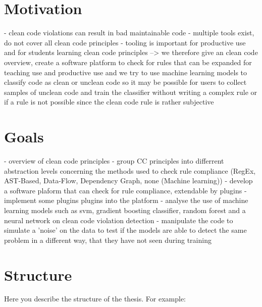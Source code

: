 \section{Motivation}
- clean code violations can result in bad maintainable code
- multiple tools exist, do not cover all clean code principles
- tooling is important for productive use and for students learning clean code principles
--> we therefore give an clean code overview, create a software platform to check for rules that can be expanded for teaching use and productive use and we try to use machine learning models to classify code as clean or unclean code so it may be possible for users to collect samples of unclean code and train the classifier without writing a complex rule or if a rule is not possible since the clean code rule is rather subjective

\section{Goals}
- overview of clean code principles
- group CC principles into differrent abstraction levels concerning the methods used to check rule compliance (RegEx, AST-Based, Data-Flow, Dependency Graph, none (Machine learning))
- develop a software plaform that can check for rule compliance, extendable by plugins
- implement some plugins plugins into the platform 
- analyse the use of machine learning models such as svm, gradient boosting classifier, random forest and a neural network on clean code violation detection
- manipulate the code to simulate a 'noise' on the data to test if the models are able to detect the same problem in a different way, that they have not seen during training

\section{Structure}
Here you describe the structure of the thesis. For example: